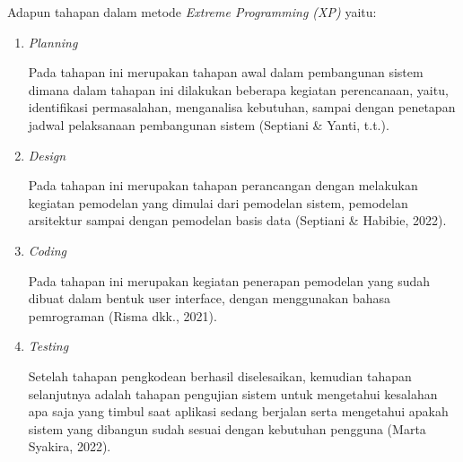 \par Adapun tahapan dalam metode \textit{Extreme Programming (XP)} yaitu:

		\begin{enumerate}
			\item \textit{Planning}
			\par Pada tahapan ini merupakan tahapan awal dalam pembangunan sistem dimana dalam tahapan ini dilakukan beberapa kegiatan perencanaan, yaitu, identifikasi permasalahan, menganalisa kebutuhan, sampai dengan penetapan jadwal pelaksanaan pembangunan sistem (Septiani \& Yanti, t.t.).
			\item \textit{Design}
			\par Pada tahapan ini merupakan tahapan perancangan dengan melakukan kegiatan pemodelan yang dimulai dari pemodelan sistem, pemodelan arsitektur sampai dengan pemodelan basis data (Septiani \& Habibie, 2022).
			\item \textit{Coding}
			\par Pada tahapan ini merupakan kegiatan penerapan pemodelan yang sudah dibuat dalam bentuk user interface, dengan menggunakan bahasa pemrograman (Risma dkk., 2021).
			\item \textit{Testing}
			\par Setelah tahapan pengkodean berhasil diselesaikan, kemudian tahapan selanjutnya adalah tahapan pengujian sistem untuk mengetahui kesalahan apa saja yang timbul saat aplikasi sedang berjalan serta mengetahui apakah sistem yang dibangun sudah sesuai dengan kebutuhan pengguna (Marta Syakira, 2022).
		\end{enumerate}
